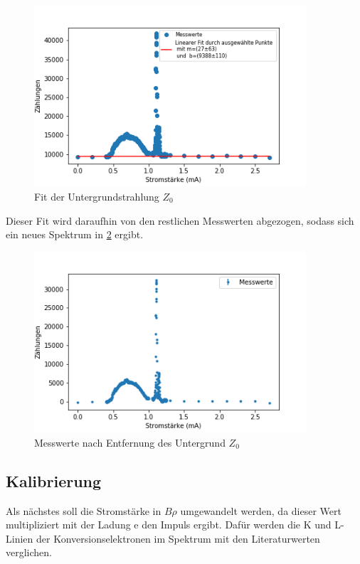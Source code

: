 \begin{figure}[h]
	\centering
	\includegraphics[width=0.9\textwidth]{../Messdaten/Untergrund.png}
	\caption{Fit der Untergrundstrahlung $Z_{0}$}
	\label{z0}
\end{figure}


Dieser Fit wird daraufhin von den restlichen Messwerten abgezogen, sodass sich ein neues Spektrum in \cref{z01} ergibt. 



\begin{figure}[h]
	\centering
	\includegraphics[width=0.9\textwidth]{../Messdaten/Ohne_Untergrund.png}
	\caption{Messwerte nach Entfernung des Untergrund $Z_{0}$}
	\label{z01}
\end{figure}

\subsection{Kalibrierung}
Als nächstes soll die Stromstärke in $B \rho$ umgewandelt werden, da dieser Wert multipliziert mit der Ladung e den Impuls ergibt. Dafür werden die K und L-Linien der Konversionselektronen im Spektrum mit den Literaturwerten verglichen. 

